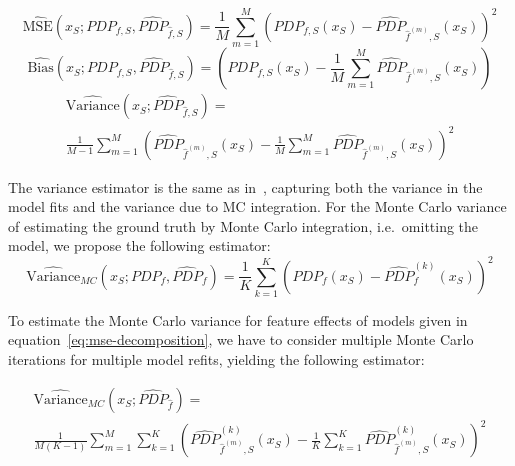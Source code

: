 \documentclass[runningheads]{llncs}
\begin{document}
\begin{equation}
    \widehat{\text{MSE}}(x_S; PDP_{f,S}, \widehat{PDP}_{\hat f,S}) = \frac{1}{M} \sum_{m=1}^{M} {(PDP_{f,S}(x_S) - \widehat{PDP}_{\hat f^{(m)},S}(x_S))}^2
    \label{eq:mse-estimator}
\end{equation}
\begin{equation}
    \widehat{\text{Bias}}(x_S; PDP_{f,S}, \widehat{PDP}_{\hat f,S}) = (PDP_{f,S}(x_S) - \frac{1}{M}\sum_{m=1}^M \widehat{PDP}_{\hat{f}^{(m)},S}(x_S))
    \label{eq:bias-estimator}
\end{equation}
\begin{equation}
    \begin{split}
    \widehat{\text{Variance}}(x_S; \widehat{PDP}_{\hat f,S}) = \\
    \frac{1}{M-1}\sum_{m=1}^M{\left(\widehat{PDP}_{\hat f^{(m)},S}(x_S) - \frac{1}{M}\sum_{m=1}^M \widehat{PDP}_{\hat f^{(m)},S}(x_S)\right)}^2
    \end{split}
    \label{eq:variance-estimator}
\end{equation}

\noindent The variance estimator is the same as in~\cite{molnar_relating_2023},
capturing both the variance in the model fits and the variance due to
MC integration. For the Monte Carlo variance of estimating the ground truth by
Monte Carlo integration, i.e.\ omitting the model, we propose the following estimator:
\begin{equation}
    \widehat{\text{Variance}}_{MC}(x_S; PDP_f, \widehat{PDP}_f) = \frac{1}{K}\sum_{k=1}^K{(PDP_f(x_S) - \widehat{PDP}_f^{(k)}(x_S))}^2
    \label{eq:mc-variance-estimator-groundtruth}
\end{equation}

\noindent To estimate the Monte Carlo variance for feature effects of models
given in equation~\ref{eq:mse-decomposition}, we have to consider multiple
Monte Carlo iterations for multiple model refits, yielding the following estimator:

\begin{equation}
    \begin{split}
        \widehat{\text{Variance}}_{MC}(x_S; \widehat{PDP}_{\hat{f}}) = \\ \frac{1}{M(K-1)}\sum_{m=1}^M \sum_{k=1}^K
        {\left(\widehat{PDP}_{\hat f^{(m)},S}^{(k)}(x_S) - \frac{1}{K}\sum_{k=1}^K \widehat{PDP}_{\hat f^{(m)},S}^{(k)}(x_S)\right)}^2
    \end{split}
    \label{eq:mc-variance-estimator-model}
\end{equation}
\end{document}
